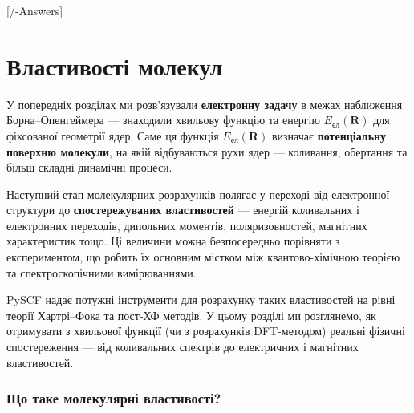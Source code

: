 
[\currfilebase/\currfilebase-Answers]
\chapter{Властивості молекул}\label{\currfilebase}

У попередніх розділах ми розв’язували \textbf{електронну задачу}
в межах наближення Борна–Опенгеймера --- знаходили хвильову функцію
та енергію $E_\text{ел}(\mathbf{R})$ для фіксованої геометрії ядер.
Саме ця функція $E_\text{ел}(\mathbf{R})$ визначає
\textbf{потенціальну поверхню молекули}, на якій відбуваються
рухи ядер --- коливання, обертання та більш складні динамічні процеси.

Наступний етап молекулярних розрахунків полягає у переході
від електронної структури до \textbf{спостережуваних властивостей} ---
енергій коливальних і електронних переходів, дипольних моментів,
поляризовностей, магнітних характеристик тощо.
Ці величини можна безпосередньо порівняти з експериментом,
що робить їх основним містком між квантово-хімічною теорією
та спектроскопічними вимірюваннями.

PySCF надає потужні інструменти для розрахунку таких властивостей
на рівні теорії Хартрі–Фока та пост-ХФ методів.
У цьому розділі ми розглянемо, як отримувати з хвильової функції (чи з розрахунків DFT-методом)
реальні фізичні спостереження --- від коливальних спектрів
до електричних і магнітних властивостей.

%
%

\subsection{Що таке молекулярні властивості?}

